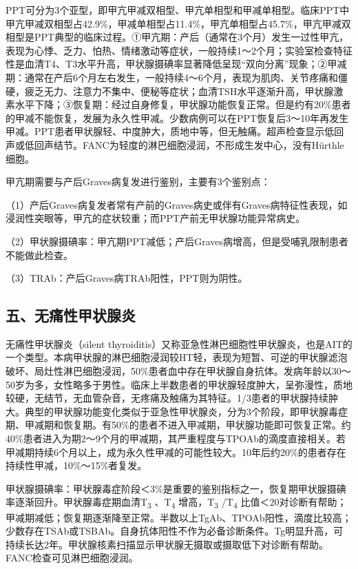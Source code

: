 PPT可分为3个亚型，即甲亢甲减双相型、甲亢单相型和甲减单相型。临床PPT中甲亢甲减双相型占42.9\%，甲减单相型占11.4\%，甲亢单相型占45.7\%，甲亢甲减双相型是PPT典型的临床过程。①甲亢期：产后（通常在3个月）发生一过性甲亢，表现为心悸、乏力、怕热、情绪激动等症状，一般持续1～2个月；实验室检查特征性是血清T4、T3水平升高，甲状腺摄碘率显著降低呈现“双向分离”现象；②甲减期：通常在产后6个月左右发生，一般持续4～6个月，表现为肌肉、关节疼痛和僵硬，疲乏无力、注意力不集中、便秘等症状；血清TSH水平逐渐升高，甲状腺激素水平下降；③恢复期：经过自身修复，甲状腺功能恢复正常。但是约有20\%患者的甲减不能恢复，发展为永久性甲减。少数病例可以在PPT恢复后3～10年再发生甲减。PPT患者甲状腺轻、中度肿大，质地中等，但无触痛。超声检查显示低回声或低回声结节。FANC为轻度的淋巴细胞浸润，不形成生发中心，没有Hürthle细胞。

甲亢期需要与产后Graves病复发进行鉴别，主要有3个鉴别点：

（1）产后Graves病复发者常有产前的Graves病史或伴有Graves病特征性表现，如浸润性突眼等，甲亢的症状较重；而PPT产前无甲状腺功能异常病史。

（2）甲状腺摄碘率：甲亢期PPT减低；产后Graves病增高，但是受哺乳限制患者不能做此检查。

（3）TRAb：产后Graves病TRAb阳性，PPT则为阴性。

\subsection{五、无痛性甲状腺炎}

无痛性甲状腺炎（silent
thyroiditis）又称亚急性淋巴细胞性甲状腺炎，也是AIT的一个类型。本病甲状腺的淋巴细胞浸润较HT轻，表现为短暂、可逆的甲状腺滤泡破坏、局灶性淋巴细胞浸润，50\%患者血中存在甲状腺自身抗体。发病年龄以30～50岁为多，女性略多于男性。临床上半数患者的甲状腺轻度肿大，呈弥漫性，质地较硬，无结节，无血管杂音，无疼痛及触痛为其特征。1/3患者的甲状腺持续肿大。典型的甲状腺功能变化类似于亚急性甲状腺炎，分为3个阶段，即甲状腺毒症期、甲减期和恢复期。有50\%的患者不进入甲减期，甲状腺功能即可恢复正常。约40\%患者进入为期2～9个月的甲减期，其严重程度与TPOAb的滴度直接相关。若甲减期持续6个月以上，成为永久性甲减的可能性较大。10年后约20\%的患者存在持续性甲减，10\%～15\%者复发。

甲状腺摄碘率：甲状腺毒症阶段＜3\%是重要的鉴别指标之一，恢复期甲状腺摄碘率逐渐回升。甲状腺毒症期血清T\textsubscript{3}
、T\textsubscript{4} 增高，T\textsubscript{3} /T\textsubscript{4}
比值＜20对诊断有帮助；甲减期减低；恢复期逐渐降至正常。半数以上TgAb、TPOAb阳性，滴度比较高；少数存在TSAb或TSBAb。自身抗体阳性不作为必备诊断条件。Tg明显升高，可持续长达2年。甲状腺核素扫描显示甲状腺无摄取或摄取低下对诊断有帮助。FANC检查可见淋巴细胞浸润。


